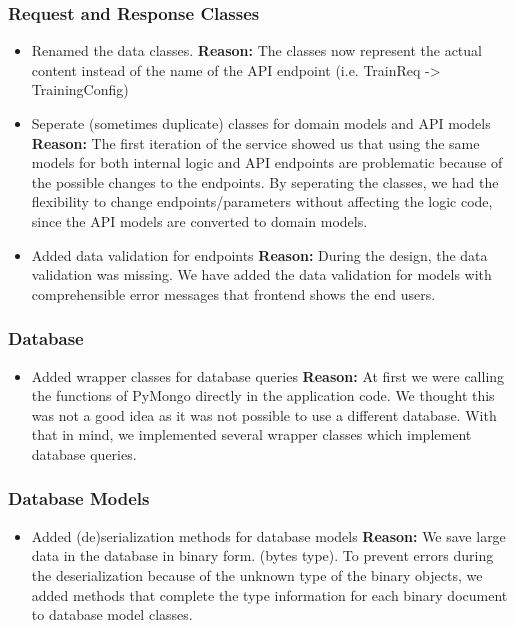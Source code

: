 \subsubsection{Request and Response Classes}
\begin{itemize}
    \item
    Renamed the data classes.
    \newline
    \textbf{Reason:} The classes now represent the actual content instead of the name
    of the API endpoint (i.e. TrainReq -> TrainingConfig)
    \item
    Seperate (sometimes duplicate) classes for domain models and API models
    \newline
    \textbf{Reason:} The first iteration of the service showed us that using the
    same models for both internal logic and API endpoints are problematic because
    of the possible changes to the endpoints. By seperating the classes, we had
    the flexibility to change endpoints/parameters without affecting the logic code,
    since the API models are converted to domain models.
    \item
    Added data validation for endpoints 
    \newline
    \textbf{Reason:} During the design, the data validation was missing. We have
    added the data validation for models with comprehensible error messages that
    frontend shows the end users.
\end{itemize}

\subsubsection{Database}
\begin{itemize}
    \item
    Added wrapper classes for database queries
    \newline
    \textbf{Reason:} At first we were calling the functions of PyMongo directly in
    the application code. We thought this was not a good idea as it was not possible
    to use a different database. With that in mind, we implemented several wrapper
    classes which implement database queries.
\end{itemize}

\subsubsection{Database Models}
\begin{itemize}
    \item
    Added (de)serialization methods for database models
    \newline
    \textbf{Reason:} We save large data in the database in binary form. 
    (bytes type). To prevent errors during the deserialization because of the
    unknown type of the binary objects, we added methods that complete
    the type information for each binary document to database model classes.
\end{itemize}

